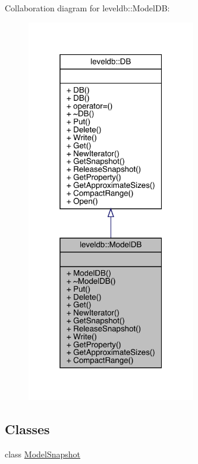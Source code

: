 Collaboration diagram for leveldb\+::Model\+DB\+:
\nopagebreak
\begin{figure}[H]
\begin{center}
\leavevmode
\includegraphics[width=208pt]{classleveldb_1_1_model_d_b__coll__graph}
\end{center}
\end{figure}
\subsection*{Classes}
\begin{DoxyCompactItemize}
\item 
class \mbox{\hyperlink{classleveldb_1_1_model_d_b_1_1_model_snapshot}{Model\+Snapshot}}
\end{DoxyCompactItemize}
